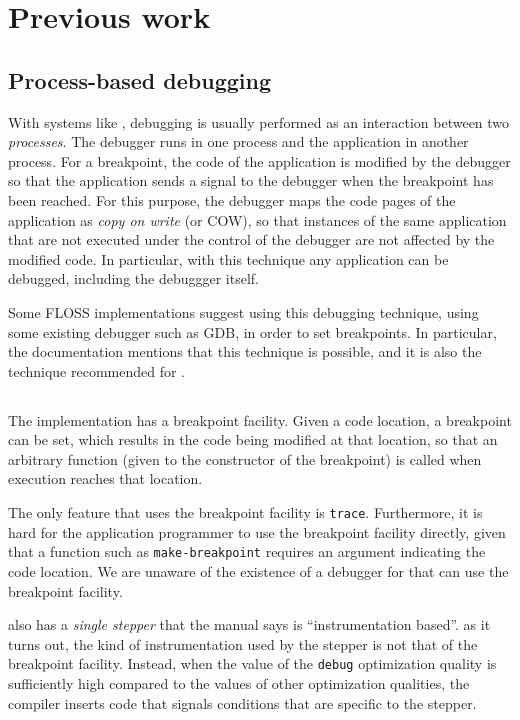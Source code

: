 \section{Previous work}

\subsection{Process-based debugging}

With systems like \unix{}, debugging is usually performed as an
interaction between two \emph{processes}.  The debugger runs in one
process and the application in another process.  For a breakpoint, the
code of the application is modified by the debugger so that the
application sends a signal to the debugger when the breakpoint has
been reached.  For this purpose, the debugger maps the code pages of
the application as \emph{copy on write} (or COW), so that instances of
the same application that are not executed under the control of the
debugger are not affected by the modified code.  In particular, with
this technique any application can be debugged, including the
debuggger itself.

Some FLOSS \commonlisp{} implementations suggest using this debugging
technique, using some existing debugger such as GDB, in order to set
breakpoints.  In particular, the \ccl{} documentation mentions that
this technique is possible, and it is also the technique recommended
for \ecl{}.

\subsection{\sbcl{}}

The \sbcl{} \commonlisp{} implementation has a breakpoint facility.
Given a code location, a breakpoint can be set, which results in the
code being modified at that location, so that an arbitrary function
(given to the constructor of the breakpoint) is called when execution
reaches that location.

The only feature that uses the breakpoint facility is \texttt{trace}.
Furthermore, it is hard for the application programmer to use the
breakpoint facility directly, given that a function such as
\texttt{make-breakpoint} requires an argument indicating the code
location.  We are unaware of the existence of a debugger for \sbcl{}
that can use the breakpoint facility.

\sbcl{} also has a \emph{single stepper} that the manual says is
``instrumentation based''.  as it turns out, the kind of
instrumentation used by the stepper is not that of the breakpoint
facility.  Instead, when the value of the \texttt{debug} optimization
quality is sufficiently high compared to the values of other
optimization qualities, the compiler inserts code that signals
conditions that are specific to the stepper.

